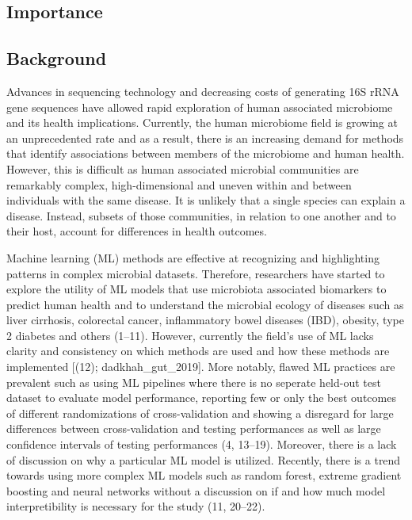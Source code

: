 \documentclass[11pt,]{article}
\begin{document}
\subsection{Importance}\label{importance}

\newpage

\subsection{Background}\label{background}

Advances in sequencing technology and decreasing costs of generating 16S
rRNA gene sequences have allowed rapid exploration of human associated
microbiome and its health implications. Currently, the human microbiome
field is growing at an unprecedented rate and as a result, there is an
increasing demand for methods that identify associations between members
of the microbiome and human health. However, this is difficult as human
associated microbial communities are remarkably complex,
high-dimensional and uneven within and between individuals with the same
disease. It is unlikely that a single species can explain a disease.
Instead, subsets of those communities, in relation to one another and to
their host, account for differences in health outcomes.

Machine learning (ML) methods are effective at recognizing and
highlighting patterns in complex microbial datasets. Therefore,
researchers have started to explore the utility of ML models that use
microbiota associated biomarkers to predict human health and to
understand the microbial ecology of diseases such as liver cirrhosis,
colorectal cancer, inflammatory bowel diseases (IBD), obesity, type 2
diabetes and others (1--11). However, currently the field's use of ML
lacks clarity and consistency on which methods are used and how these
methods are implemented {[}(12); dadkhah\_gut\_2019{]}. More notably,
flawed ML practices are prevalent such as using ML pipelines where there
is no seperate held-out test dataset to evaluate model performance,
reporting few or only the best outcomes of different randomizations of
cross-validation and showing a disregard for large differences between
cross-validation and testing performances as well as large confidence
intervals of testing performances (4, 13--19). Moreover, there is a lack
of discussion on why a particular ML model is utilized. Recently, there
is a trend towards using more complex ML models such as random forest,
extreme gradient boosting and neural networks without a discussion on if
and how much model interpretibility is necessary for the study (11,
20--22).
\end{document}

